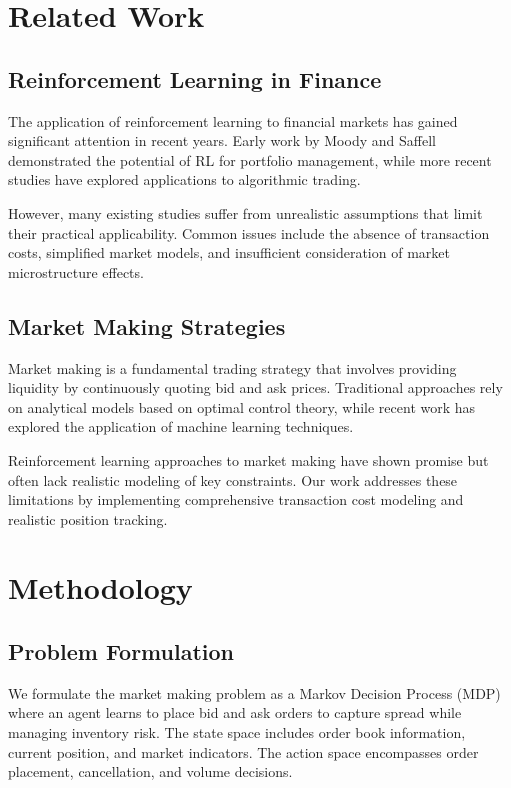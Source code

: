 \documentclass[11pt,a4paper]{article}
\begin{document}
\section{Related Work}

\subsection{Reinforcement Learning in Finance}

The application of reinforcement learning to financial markets has gained significant attention in recent years. Early work by Moody and Saffell demonstrated the potential of RL for portfolio management, while more recent studies have explored applications to algorithmic trading.

However, many existing studies suffer from unrealistic assumptions that limit their practical applicability. Common issues include the absence of transaction costs, simplified market models, and insufficient consideration of market microstructure effects.

\subsection{Market Making Strategies}

Market making is a fundamental trading strategy that involves providing liquidity by continuously quoting bid and ask prices. Traditional approaches rely on analytical models based on optimal control theory, while recent work has explored the application of machine learning techniques.

Reinforcement learning approaches to market making have shown promise but often lack realistic modeling of key constraints. Our work addresses these limitations by implementing comprehensive transaction cost modeling and realistic position tracking.

\section{Methodology}

\subsection{Problem Formulation}

We formulate the market making problem as a Markov Decision Process (MDP) where an agent learns to place bid and ask orders to capture spread while managing inventory risk. The state space includes order book information, current position, and market indicators. The action space encompasses order placement, cancellation, and volume decisions.
\end{document}
